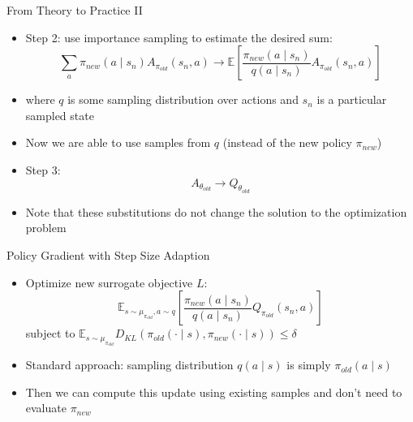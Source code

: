 \documentclass[aspectratio=169]{../latex_main/tntbeamer}  %
\begin{document}
\begin{frame}[c]{From Theory to Practice II}
	
    \begin{itemize}
        \item Step 2: use \alert{importance sampling} to estimate the desired sum:
        $$\sum_{a} \pi_{new} (a\mid s_n) A_{\pi_{old}} (s_n, a) \to \mathbb{E}\left[ \frac{\pi_{new}(a \mid s_n)}{q(a\mid s_n)} A_{\pi_{old}} (s_n, a) \right] $$
        \item where $q$ is some sampling distribution over actions and $s_n$ is a particular sampled state
        \item Now we are able to use samples from $q$ (instead of the new policy $\pi_{new}$)
        \pause
        \item Step 3:
        $$ A_{\theta_{old}} \to Q_{\theta_{old}}$$
        \item Note that these substitutions do not change the solution to the optimization problem
    \end{itemize}

\end{frame}
\begin{frame}[c]{Policy Gradient with Step Size Adaption}
	
    \begin{itemize}
        \item Optimize new surrogate objective $L$:
        $$ \mathbb{E}_{s\sim \mu_{\pi_{old}}, a \sim q} \left[ \frac{\pi_{new}(a \mid s_n)}{q(a\mid s_n)} Q_{\pi_{old}} (s_n, a) \right]$$
        {\centering subject to $\mathbb{E}_{s\sim \mu_{\pi_{old}}} D_{KL}(\pi_{old}(\cdot \mid s), \pi_{new} (\cdot \mid s)) \leq \delta$ \\}
        \item Standard approach: sampling distribution $q(a\mid s)$ is simply $\pi_{old}(a \mid s)$
        \item Then we can compute this update using existing samples and don't need to evaluate $\pi_{new}$
    \end{itemize}
    

\end{frame}
\end{document}
